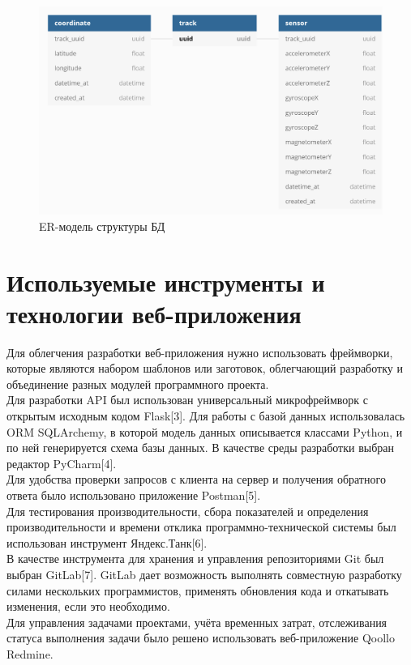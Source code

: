 \documentclass[a4paper, 10pt]{article}
\begin{document}
	\begin{figure}[h!]
		\centering
		\includegraphics[scale=0.8]{er-diagram}
		\centering\caption{ER-модель структуры БД}
	\end{figure}
	 \section{Используемые инструменты и технологии веб-приложения}
	\hspace*{5mm} Для облегчения разработки веб-приложения нужно использовать фреймворки, которые являются набором шаблонов или заготовок, облегчающий разработку и объединение разных модулей программного проекта.   
	\\ \hspace*{5mm} Для разработки API был использован универсальный микрофреймворк с открытым исходным кодом Flask[3]. Для работы с базой данных использовалась ORM SQLArchemy, в которой модель данных описывается классами Python, и по ней генерируется схема базы данных. В качестве среды разработки выбран редактор PyCharm[4]. 
	\\ \hspace*{5mm} Для удобства проверки запросов с клиента на сервер и получения обратного ответа было использовано приложение Postman[5].
	\\ \hspace*{5mm} Для тестирования производительности, сбора показателей и определения производительности и времени отклика программно-технической системы был использован инструмент Яндекс.Танк[6]. 
	\\ \hspace*{5mm} В качестве инструмента для хранения и управления репозиториями Git был выбран GitLab[7]. GitLab дает возможность выполнять совместную разработку силами нескольких программистов, применять обновления кода и откатывать изменения, если это необходимо.
	\\ \hspace*{5mm} Для управления задачами проектами, учёта временных затрат, отслеживания статуса выполнения задачи было решено использовать веб-приложение Qoollo Redmine. 
\end{document}
